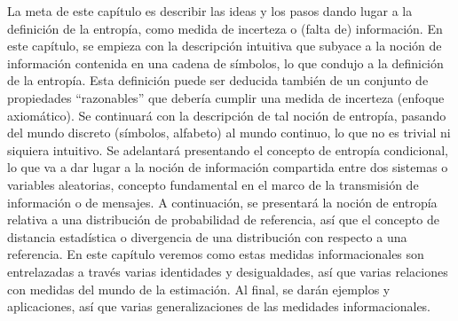 La meta de este  cap\'itulo es describir las ideas y los  pasos dando lugar a la
definici\'on  de  la   entrop\'ia,  como  medida  de  incerteza   o  (falta  de)
informaci\'on.  En  este cap\'itulo, se  empieza con la  descripci\'on intuitiva
que  subyace  a  la  noci\'on  de  informaci\'on  contenida  en  una  cadena  de
s\'imbolos,  lo  que   condujo  a  la  definici\'on  de   la  entrop\'ia.   Esta
definici\'on  puede  ser  deducida  tambi\'en  de  un  conjunto  de  propiedades
``razonables''  que   deber\'ia  cumplir   una  medida  de   incerteza  (enfoque
axiom\'atico).   Se  continuar\'a  con  la  descripci\'on  de  tal  noci\'on  de
entrop\'ia, pasando del mundo discreto (s\'imbolos, alfabeto) al mundo continuo,
lo  que no es  trivial ni  siquiera intuitivo.   Se adelantar\'a  presentando el
concepto  de entrop\'ia condicional,  lo que  va a  dar lugar  a la  noci\'on de
informaci\'on  compartida entre  dos sistemas  o variables  aleatorias, concepto
fundamental en  el marco de la  transmisi\'on de informaci\'on o  de mensajes. A
continuaci\'on,  se  presentar\'a  la  noci\'on  de entrop\'ia  relativa  a  una
distribuci\'on de probabilidad de referencia, as\'i que el concepto de distancia
estad\'istica  o   divergencia  de  una   distribuci\'on  con  respecto   a  una
referencia. En  este cap\'itulo veremos  como estas medidas  informacionales son
entrelazadas  a trav\'es varias  identidades y  desigualdades, as\'i  que varias
relaciones  con medidas  del  mundo de  la  estimaci\'on. Al  final, se  dar\'an
ejemplos  y aplicaciones,  as\'i que  varias generalizaciones  de  las medidades
informacionales.

\

